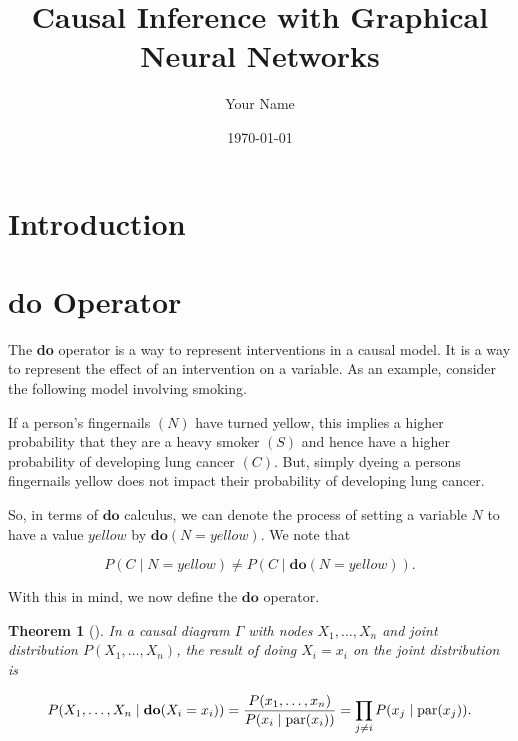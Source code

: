 \documentclass{article}
\newtheorem{theorem}{Theorem}[section]
\begin{document}
\title{Causal Inference with Graphical Neural Networks}
\author{Your Name}
\date{\today}
\maketitle

\section{Introduction}



\section{$\textbf{do}$ Operator}

The \textbf{do} operator is a way to represent interventions in a causal model. 
It is a way to represent the effect of an intervention on a variable. As an example, 
consider the following model involving smoking.

If a person's fingernails $(N)$ have turned yellow, this implies a higher probability 
that they are a heavy smoker $(S)$ and hence have a higher probability of developing 
lung cancer $(C)$. But, simply dyeing a persons fingernails yellow does not impact 
their probability of developing lung cancer. 

So, in terms of $\textbf{do}$ calculus, we can denote the process of setting a 
variable $N$ to have a value $\textit{yellow}$ by $\textbf{do}(N = \textit{yellow})$. 
We note that 

\begin{equation*}
P(C \;|\;N = \textit{yellow}) \neq P(C\;|\; \textbf{do}(N=\textit{yellow})).
\end{equation*}

With this in mind, we now define the $\textbf{do}$ operator.

\begin{theorem}[{{\cite{pearl2009causal}}}]
    In a causal diagram $\Gamma$ with nodes $X_1,\dots, X_n$ and joint distribution 
    $P(X_1, \dots, X_n)$, the result of doing $X_i = x_i$ on the joint distribution is

    \[
        P(X_1, \dots, X_n \;|\; \textbf{do}(X_i = x_i)) = \frac{P(x_1,\dots,x_n)}{P(x_i\;|\; \textup{par}(x_i))} = \prod_{j\neq i}P(x_j\;|\; \textup{par}(x_j)).
    \]
    \label{theorem:do}
\end{theorem}
\end{document}
